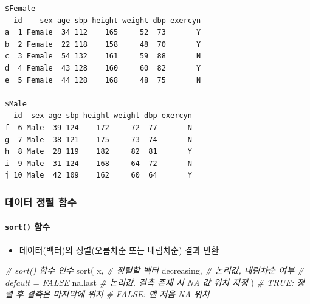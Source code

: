 \documentclass[
  11pt,
]{krantz}
\newenvironment{Shaded}{\begin{snugshade}}{\end{snugshade}}
\newcommand{\CommentTok}[1]{\textcolor[rgb]{0.37,0.37,0.37}{\textit{#1}}}
\newcommand{\FunctionTok}[1]{\textcolor[rgb]{0,0,0}{#1}}
\newcommand{\NormalTok}[1]{#1}
\newcommand{\SpecialCharTok}[1]{\textcolor[rgb]{0,0,0}{#1}}
\providecommand{\tightlist}{%
  \setlength{\itemsep}{0pt}\setlength{\parskip}{0pt}}
\begin{document}
\footnotesize

\begin{Shaded}
\end{Shaded}

\begin{verbatim}
$Female
  id    sex age sbp height weight dbp exercyn
a  1 Female  34 112    165     52  73       Y
b  2 Female  22 118    158     48  70       Y
c  3 Female  54 132    161     59  88       N
d  4 Female  43 128    160     60  82       Y
e  5 Female  44 128    168     48  75       N

$Male
  id  sex age sbp height weight dbp exercyn
f  6 Male  39 124    172     72  77       N
g  7 Male  38 121    175     73  74       N
h  8 Male  28 119    182     82  81       Y
i  9 Male  31 124    168     64  72       N
j 10 Male  42 109    162     60  64       Y
\end{verbatim}

\normalsize

\hypertarget{sort-fun}{%
\subsubsection*{데이터 정렬 함수}\label{sort-fun}}


\hypertarget{sort}{%
\paragraph*{\texorpdfstring{\texttt{sort()} 함수}{sort() 함수}}\label{sort}}

\begin{itemize}
\tightlist
\item
  데이터(벡터)의 정렬(오름차순 또는 내림차순) 결과 반환
\end{itemize}

\footnotesize

\begin{Shaded}
\begin{Highlighting}[]
\CommentTok{\# sort() 함수 인수}
\FunctionTok{sort}\NormalTok{(}
\NormalTok{  x, }\CommentTok{\# 정렬할 벡터}
\NormalTok{  decreasing, }\CommentTok{\# 논리값, 내림차순 여부}
              \CommentTok{\# default = FALSE}
\NormalTok{  na.last }\CommentTok{\# 논리값. 결측 존재 시 NA 값 위치 지정}
\NormalTok{)         }\CommentTok{\# TRUE: 정렬 후 결측은 마지막에 위치}
          \CommentTok{\# FALSE: 맨 처음 NA 위치}
\end{Highlighting}
\end{Shaded}
\end{document}
